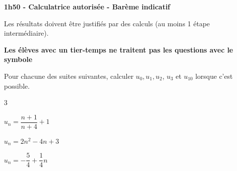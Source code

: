 \documentclass[12pt,a4paper]{article}  %
\begin{document}
\graphicspath{{../images/}}

\begin{center}

\end{center}


\begin{center}\textbf{1h50 - Calculatrice autorisée - Barème indicatif}\end{center}


\begin{center}
Les résultats doivent être justifiés par des calculs (au moins 1 étape intermédiaire).
\end{center}

\begin{center}\textbf{Les élèves avec un tier-temps ne traitent pas les questions avec  le symbole }\end{center}


Pour chacune des suites suivantes, calculer $u_0, u_1, u_2$, $u_3$ et $u_{10}$ lorsque c'est possible.
\begin{multicols}{3}
	\begin{enumMet}
		\item $u_n=\dfrac{n+1}{n+4}+1$
		\item $u_n=2n^2-4 n+3$
		\item {} $u_n=-\dfrac{5}{4}+\dfrac{1}{4} n$
	\end{enumMet}
\end{multicols}

\end{document}
